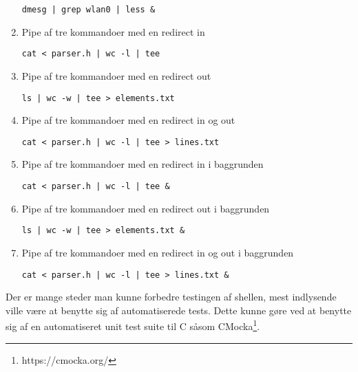 \begin{enumerate}
	\verb+dmesg | grep wlan0 | less &+
	\item  Pipe af tre kommandoer med en redirect in
	
	\verb+cat < parser.h | wc -l | tee+
	\item  Pipe af tre kommandoer med en redirect out
	
	\verb+ls | wc -w | tee > elements.txt+
	\item  Pipe af tre kommandoer med en redirect in og out
	
	\verb+cat < parser.h | wc -l | tee > lines.txt+
	\item  Pipe af tre kommandoer med en redirect in i baggrunden
	
	\verb+cat < parser.h | wc -l | tee &+
	\item  Pipe af tre kommandoer med en redirect out i baggrunden
	
	\verb+ls | wc -w | tee > elements.txt &+
	\item  Pipe af tre kommandoer med en redirect in og out i baggrunden
	
	\verb+cat < parser.h | wc -l | tee > lines.txt &+
\end{enumerate}

Der er mange steder man kunne forbedre testingen af shellen, mest indlysende ville være at benytte sig af automatiserede tests. Dette kunne gøre ved at benytte sig af en automatiseret unit test suite til C såsom CMocka\footnote{https://cmocka.org/}.
